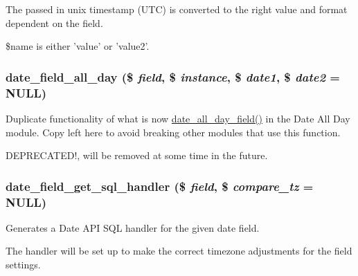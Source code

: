 The passed in unix timestamp (UTC) is converted to the right value and format dependent on the field.

\$name is either 'value' or 'value2'. \hypertarget{date_8module_a4432aec91a1a568280bd83cc206656c7}{
\subsubsection[{date\_\-field\_\-all\_\-day}]{\setlength{\rightskip}{0pt plus 5cm}date\_\-field\_\-all\_\-day (\$ {\em field}, \/  \$ {\em instance}, \/  \$ {\em date1}, \/  \$ {\em date2} = {\ttfamily NULL})}}
\label{date_8module_a4432aec91a1a568280bd83cc206656c7}
Duplicate functionality of what is now \hyperlink{date__all__day_8module_ac20133ba5eee4f790d2a29eed85b1a91}{date\_\-all\_\-day\_\-field()} in the Date All Day module. Copy left here to avoid breaking other modules that use this function.

DEPRECATED!, will be removed at some time in the future. \hypertarget{date_8module_add73c8c0d356b03c045b53a19283df11}{
\subsubsection[{date\_\-field\_\-get\_\-sql\_\-handler}]{\setlength{\rightskip}{0pt plus 5cm}date\_\-field\_\-get\_\-sql\_\-handler (\$ {\em field}, \/  \$ {\em compare\_\-tz} = {\ttfamily NULL})}}
\label{date_8module_add73c8c0d356b03c045b53a19283df11}
Generates a Date API SQL handler for the given date field.

The handler will be set up to make the correct timezone adjustments for the field settings.


